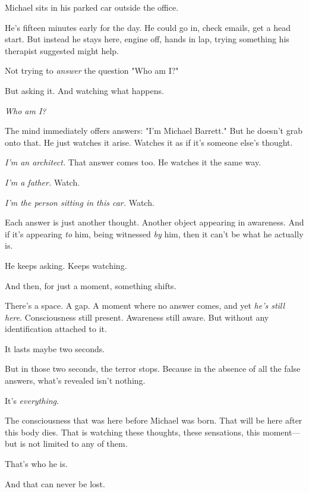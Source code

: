 \documentclass[11pt,twoside]{book}
\begin{document}
Michael sits in his parked car outside the office.

He's fifteen minutes early for the day. He could go in, check emails, get a head start. But instead he stays here, engine off, hands in lap, trying something his therapist suggested might help.

Not trying to \emph{answer} the question "Who am I?"

But asking it. And watching what happens.

\emph{Who am I?}

The mind immediately offers answers: "I'm Michael Barrett." But he doesn't grab onto that. He just watches it arise. Watches it as if it's someone else's thought.

\emph{I'm an architect.} That answer comes too. He watches it the same way.

\emph{I'm a father.} Watch.

\emph{I'm the person sitting in this car.} Watch.

Each answer is just another thought. Another object appearing in awareness. And if it's appearing \emph{to} him, being witnessed \emph{by} him, then it can't be what he actually is.

He keeps asking. Keeps watching.

And then, for just a moment, something shifts.

There's a space. A gap. A moment where no answer comes, and yet \emph{he's still here}. Consciousness still present. Awareness still aware. But without any identification attached to it.

It lasts maybe two seconds.

But in those two seconds, the terror stops. Because in the absence of all the false answers, what's revealed isn't nothing.

It's \emph{everything}.

The consciousness that was here before Michael was born. That will be here after this body dies. That is watching these thoughts, these sensations, this moment—but is not limited to any of them.

That's who he is.

And that can never be lost.
\end{document}
